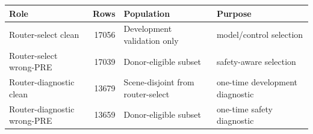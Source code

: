 \begin{tabular}{lrll}
\toprule
Role & Rows & Population & Purpose \\
\midrule
Router-select clean & 17056 & Development validation only & model/control selection \\
Router-select wrong-PRE & 17039 & Donor-eligible subset & safety-aware selection \\
Router-diagnostic clean & 13679 & Scene-disjoint from router-select & one-time development diagnostic \\
Router-diagnostic wrong-PRE & 13659 & Donor-eligible subset & one-time safety diagnostic \\
\bottomrule
\end{tabular}

